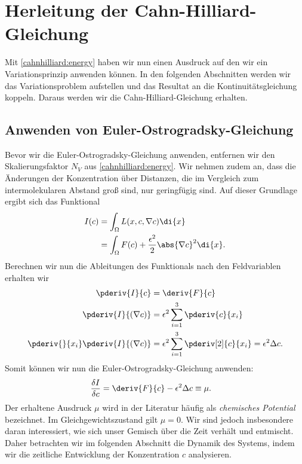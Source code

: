 %
%
%
%
\section{Herleitung der Cahn-Hilliard-Gleichung\label{cahnhilliard:section:herleitung}}
Mit \eqref{cahnhilliard:energy} haben wir nun einen Ausdruck auf den wir ein Variationsprinzip anwenden können.
In den folgenden Abschnitten werden wir das Variationsproblem aufstellen und
das Resultat an die Kontinuitätsgleichung koppeln.
Daraus werden wir die Cahn-Hilliard-Gleichung erhalten.

\subsection{Anwenden von Euler-Ostrogradsky-Gleichung}
Bevor wir die Euler-Ostrogradsky-Gleichung anwenden,
entfernen wir den Skalierungsfaktor $N_V$ aus \eqref{cahnhilliard:energy}.
Wir nehmen zudem an,
dass die Änderungen der Konzentration über Distanzen,
die im Vergleich zum intermolekularen Abstand groß sind,
nur geringfügig sind.
Auf dieser Grundlage ergibt sich das Funktional
\begin{align}
I(c)
&=
\int_\Omega L(x, c, \nabla c) \di{x}
\nonumber
\\
&=
\int_\Omega F(c) + \frac{\epsilon^2}{2} \abs{\nabla c}^2 \di{x}.
\end{align}
Berechnen wir nun die Ableitungen des Funktionals nach den Feldvariablen erhalten wir
\begin{align*}
\pderiv{I}{c}
&=
\deriv{F}{c}
\\
\pderiv{I}{(\nabla c)}
&=
\epsilon^2 \sum_{i=1}^3 \pderiv{c}{x_i}
\\
\pderiv{}{x_i}\pderiv{I}{(\nabla c)}
&=
\epsilon^2 \sum_{i=1}^3 \pderiv[2]{c}{x_i}
=
\epsilon^2 \Delta c
.
\end{align*}
Somit können wir nun die Euler-Ostrogradsky-Gleichung anwenden:
\begin{align*}
\frac{\delta I}{\delta c}
&=
\deriv{F}{c} -  \epsilon^2 \Delta c
\equiv
\mu
.
\end{align*}
Der erhaltene Ausdruck $\mu$ wird in der Literatur häufig als
\emph{chemisches Potential} bezeichnet.
Im Gleichgewichtszustand gilt $\mu = 0$.
Wir sind jedoch insbesondere daran interessiert,
wie sich unser Gemisch über die Zeit verhält und entmischt.
Daher betrachten wir im folgenden Abschnitt die Dynamik des Systems,
indem wir die zeitliche Entwicklung der Konzentration
$c$ analysieren.

